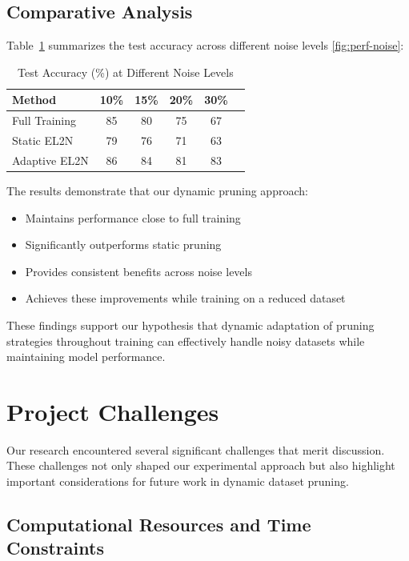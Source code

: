 \documentclass{article}
\begin{document}
\subsection{Comparative Analysis}

Table~\ref{tab:results} summarizes the test accuracy across different noise levels \ref{fig:perf-noise}:

\begin{table}[h]
\caption{Test Accuracy (\%) at Different Noise Levels}
\label{tab:results}
\centering
\begin{tabular}{lccccc}
\toprule
Method & 10\% & 15\% & 20\% & 30\% \\
\midrule
Full Training & 85 & 80 & 75 & 67 \\
Static EL2N & 79 & 76 & 71 & 63 \\
Adaptive EL2N & 86 & 84 & 81 & 83 \\
\bottomrule
\end{tabular}
\end{table}

The results demonstrate that our dynamic pruning approach:
\begin{itemize}
    \item Maintains performance close to full training
    \item Significantly outperforms static pruning
    \item Provides consistent benefits across noise levels
    \item Achieves these improvements while training on a reduced dataset
\end{itemize}

These findings support our hypothesis that dynamic adaptation of pruning strategies throughout training can effectively handle noisy datasets while maintaining model performance.

\section{Project Challenges}

Our research encountered several significant challenges that merit discussion. These challenges not only shaped our experimental approach but also highlight important considerations for future work in dynamic dataset pruning.

\subsection{Computational Resources and Time Constraints}
\end{document}
